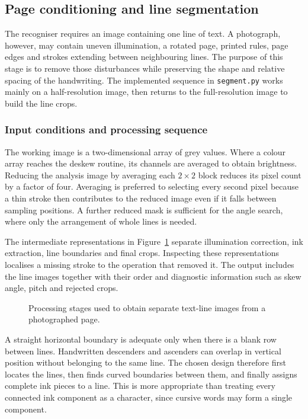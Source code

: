 \subsection{Page conditioning and line segmentation}
\label{sec:des-seg}
The recogniser requires an image containing one line of text. A photograph, however, may contain uneven illumination, a rotated page, printed rules, page edges and strokes extending between neighbouring lines. The purpose of this stage is to remove those disturbances while preserving the shape and relative spacing of the handwriting. The implemented sequence in \texttt{segment.py} works mainly on a half-resolution image, then returns to the full-resolution image to build the line crops.

\subsubsection{Input conditions and processing sequence}
The working image is a two-dimensional array of grey values. Where a colour array reaches the deskew routine, its channels are averaged to obtain brightness. Reducing the analysis image by averaging each $2\times2$ block reduces its pixel count by a factor of four. Averaging is preferred to selecting every second pixel because a thin stroke then contributes to the reduced image even if it falls between sampling positions. A further reduced mask is sufficient for the angle search, where only the arrangement of whole lines is needed.

The intermediate representations in Figure~\ref{fig:des-seg-stages} separate illumination correction, ink extraction, line boundaries and final crops. Inspecting these representations localises a missing stroke to the operation that removed it. The output includes the line images together with their order and diagnostic information such as skew angle, pitch and rejected crops.
\begin{figure}[!htbp]\centering
{}
\caption{Processing stages used to obtain separate text-line images from a photographed page.}
\label{fig:des-seg-stages}
\end{figure}

A straight horizontal boundary is adequate only when there is a blank row between lines. Handwritten descenders and ascenders can overlap in vertical position without belonging to the same line. The chosen design therefore first locates the lines, then finds curved boundaries between them, and finally assigns complete ink pieces to a line. This is more appropriate than treating every connected ink component as a character, since cursive words may form a single component.

